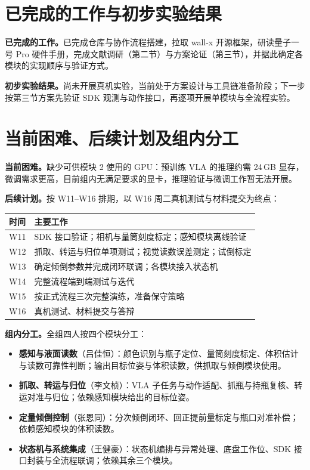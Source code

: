 \section{已完成的工作与初步实验结果}

\textbf{已完成的工作。}已完成仓库与协作流程搭建，拉取 wall-x 开源框架，研读量子一号 Pro 硬件手册，完成文献调研（第二节）与方案论证（第三节），并据此确定各模块的实现顺序与验证方式。

\textbf{初步实验结果。}尚未开展真机实验，当前处于方案设计与工具链准备阶段；下一步按第三节方案先验证 SDK 观测与动作接口，再逐项开展单模块与全流程实验。

\section{当前困难、后续计划及组内分工}

\textbf{当前困难。}缺少可供模块 2 使用的 GPU：预训练 VLA 的推理约需 24\,GB 显存，微调需求更高，目前组内无满足要求的显卡，推理验证与微调工作暂无法开展。

\textbf{后续计划。}按 W11–W16 排期，以 W16 周二真机测试与材料提交为终点：

\begin{center}
  \small
  \begin{tabular}{@{}ll@{}}
    \toprule
    时间 & 主要工作 \\
    \midrule
    W11 & SDK 接口验证；相机与量筒刻度标定；感知模块离线验证 \\
    W12 & 抓取、转运与归位单项测试；视觉读数误差测定；试倒标定 \\
    W13 & 确定倾倒参数并完成闭环联调；各模块接入状态机 \\
    W14 & 完整流程端到端测试与迭代 \\
    W15 & 按正式流程三次完整演练，准备保守策略 \\
    W16 & 真机测试、材料提交与答辩 \\
    \bottomrule
  \end{tabular}
\end{center}

\textbf{组内分工。}全组四人按四个模块分工：

\begin{itemize}[nosep,leftmargin=1.6em]
  \item \textbf{感知与液面读数}（吕佳恒）：颜色识别与瓶子定位、量筒刻度标定、体积估计与读数可靠性判断；输出目标位姿与体积读数，供抓取与倾倒模块使用。
  \item \textbf{抓取、转运与归位}（李文桢）：VLA 子任务与动作适配、抓瓶与持瓶复核、转运对准与归位；依赖感知模块给出的目标位姿。
  \item \textbf{定量倾倒控制}（张恩同）：分次倾倒闭环、回正提前量标定与瓶口对准补偿；依赖感知模块的体积读数。
  \item \textbf{状态机与系统集成}（王健豪）：状态机编排与异常处理、底盘工作位、SDK 接口封装与全流程联调；依赖其余三个模块。
\end{itemize}

